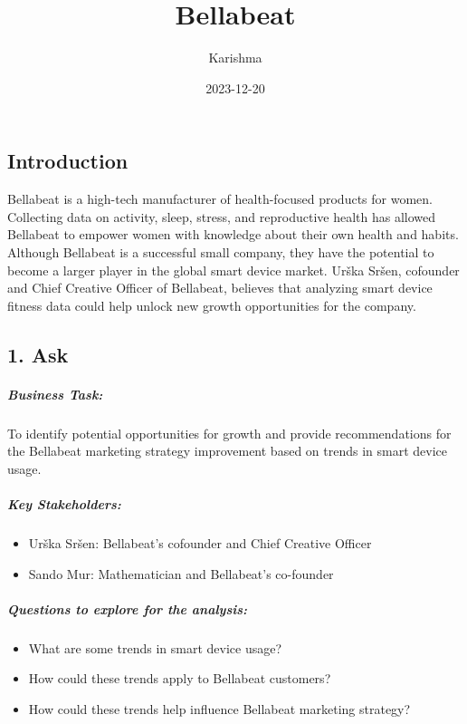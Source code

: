 \documentclass[
]{article}
\title{Bellabeat}
\author{Karishma}
\date{2023-12-20}
\providecommand{\tightlist}{%
  \setlength{\itemsep}{0pt}\setlength{\parskip}{0pt}}
\begin{document}
\maketitle

\hypertarget{introduction}{%
\subsection{Introduction}\label{introduction}}

Bellabeat is a high-tech manufacturer of health-focused products for
women. Collecting data on activity, sleep, stress, and reproductive
health has allowed Bellabeat to empower women with knowledge about their
own health and habits. Although Bellabeat is a successful small company,
they have the potential to become a larger player in the global smart
device market. Urška Sršen, cofounder and Chief Creative Officer of
Bellabeat, believes that analyzing smart device fitness data could help
unlock new growth opportunities for the company.

\hypertarget{ask}{%
\subsection{1. Ask}\label{ask}}

\hypertarget{business-task}{%
\subparagraph{Business Task:}\label{business-task}}

To identify potential opportunities for growth and provide
recommendations for the Bellabeat marketing strategy improvement based
on trends in smart device usage.

\hypertarget{key-stakeholders}{%
\subparagraph{Key Stakeholders:}\label{key-stakeholders}}

\begin{itemize}
\tightlist
\item
  Urška Sršen: Bellabeat's cofounder and Chief Creative Officer
\item
  Sando Mur: Mathematician and Bellabeat's co-founder
\end{itemize}

\hypertarget{questions-to-explore-for-the-analysis}{%
\subparagraph{Questions to explore for the
analysis:}\label{questions-to-explore-for-the-analysis}}

\begin{itemize}
\tightlist
\item
  What are some trends in smart device usage?
\item
  How could these trends apply to Bellabeat customers?
\item
  How could these trends help influence Bellabeat marketing strategy?
\end{itemize}
\end{document}
